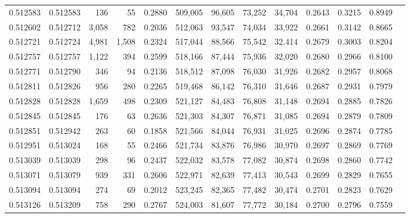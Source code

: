 \begin{tabular}{rrrrrrrrrrrrr}
0.512583 & 0.512583 &   136 &    55 &                                     0.2880 & 509,005 &  96,605 &  73,252 &  34,704 & 0.2643 & 0.3215 & 0.8949 \\
0.512602 & 0.512712 & 3,058 &   782 &                                     0.2036 & 512,063 &  93,547 &  74,034 &  33,922 & 0.2661 & 0.3142 & 0.8665 \\
0.512721 & 0.512724 & 4,981 & 1,508 &                                     0.2324 & 517,044 &  88,566 &  75,542 &  32,414 & 0.2679 & 0.3003 & 0.8204 \\
0.512757 & 0.512757 & 1,122 &   394 &                                     0.2599 & 518,166 &  87,444 &  75,936 &  32,020 & 0.2680 & 0.2966 & 0.8100 \\
0.512771 & 0.512790 &   346 &    94 &                                     0.2136 & 518,512 &  87,098 &  76,030 &  31,926 & 0.2682 & 0.2957 & 0.8068 \\
0.512811 & 0.512826 &   956 &   280 &                                     0.2265 & 519,468 &  86,142 &  76,310 &  31,646 & 0.2687 & 0.2931 & 0.7979 \\
0.512828 & 0.512828 & 1,659 &   498 &                                     0.2309 & 521,127 &  84,483 &  76,808 &  31,148 & 0.2694 & 0.2885 & 0.7826 \\
0.512845 & 0.512845 &   176 &    63 &                                     0.2636 & 521,303 &  84,307 &  76,871 &  31,085 & 0.2694 & 0.2879 & 0.7809 \\
0.512851 & 0.512942 &   263 &    60 &                                     0.1858 & 521,566 &  84,044 &  76,931 &  31,025 & 0.2696 & 0.2874 & 0.7785 \\
0.512951 & 0.513024 &   168 &    55 &                                     0.2466 & 521,734 &  83,876 &  76,986 &  30,970 & 0.2697 & 0.2869 & 0.7769 \\
0.513039 & 0.513039 &   298 &    96 &                                     0.2437 & 522,032 &  83,578 &  77,082 &  30,874 & 0.2698 & 0.2860 & 0.7742 \\
0.513071 & 0.513079 &   939 &   331 &                                     0.2606 & 522,971 &  82,639 &  77,413 &  30,543 & 0.2699 & 0.2829 & 0.7655 \\
0.513094 & 0.513094 &   274 &    69 &                                     0.2012 & 523,245 &  82,365 &  77,482 &  30,474 & 0.2701 & 0.2823 & 0.7629 \\
0.513126 & 0.513209 &   758 &   290 &                                     0.2767 & 524,003 &  81,607 &  77,772 &  30,184 & 0.2700 & 0.2796 & 0.7559 \\

\end{tabular}
